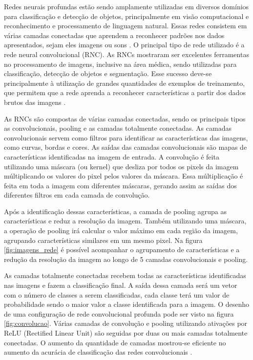 \documentclass[conference]{IEEEtran}
\begin{document}

Redes neurais profundas estão sendo amplamente utilizadas em diversos domínios para classificação e detecção de objetos, principalmente em visão computacional e reconhecimento e processamento de linguagem natural. Essas redes consistem em várias camadas conectadas que aprendem a reconhecer padrões nos dados apresentados, sejam eles imagens ou sons \cite{LeCun2015}. O principal tipo de rede utilizado é a rede neural convolucional (RNC). As RNCs mostraram ser excelentes ferramentas no processamento de imagens, inclusive na área médica, sendo utilizadas para classificação, detecção de objetos e segmentação. Esse sucesso deve-se principalmente à utilização de grandes quantidades de exemplos de treinamento, que permitem que a rede aprenda a reconhecer características a partir dos dados brutos das imagens \cite{greenspan2016}. %

As RNCs são compostas de várias camadas conectadas, sendo os principais tipos as convolucionais, pooling e as camadas totalmente conectadas. As camadas convolucionais servem como filtros para identificar as características das imagens, como curvas, bordas e cores. As saídas das camadas convolucionais são mapas de características identificadas na imagem de entrada. A convolução é feita utilizando uma máscara (ou kernel) que desliza por todos os pixels da imagem múltiplicando os valores do pixel pelos valores da máscara. Essa múltiplicação é feita em toda a imagem com diferentes máscaras, gerando assim as saídas dos diferentes filtros em cada camada de convolução.

Após a identificação dessas características, a camada de pooling agrupa as características e reduz a resolução da imagem. Também utilizando uma máscara, a operação de pooling irá calcular o valor máximo em cada região da imagem, agrupando características similares em um mesmo pixel. Na figura \ref{fig:imagens_rede} é possível acompanhar o agrupamento de características e a redução da resolução da imagem ao longo de 5 camadas convolucionais e pooling.

As camadas totalmente conectadas recebem todas as características identificadas nas imagens e fazem a classificação final. A saída dessa camada será um vetor com o número de classes a serem classificadas, cada classe terá um valor de probabilidade sendo o maior valor a classe identificada para a imagem. O desenho de uma configuração de rede convolucional profunda pode ser visto na figura \ref{fig:convolucao}. Várias camadas de convolução e pooling utilizando ativações por ReLU (Rectified Linear Unit) são seguidas por duas ou mais camadas totalmente conectadas. O aumento da quantidade de camadas mostrou-se eficiente no aumento da acurácia de classificação das redes convolucionais \cite{simonyan2014}.
\end{document}
